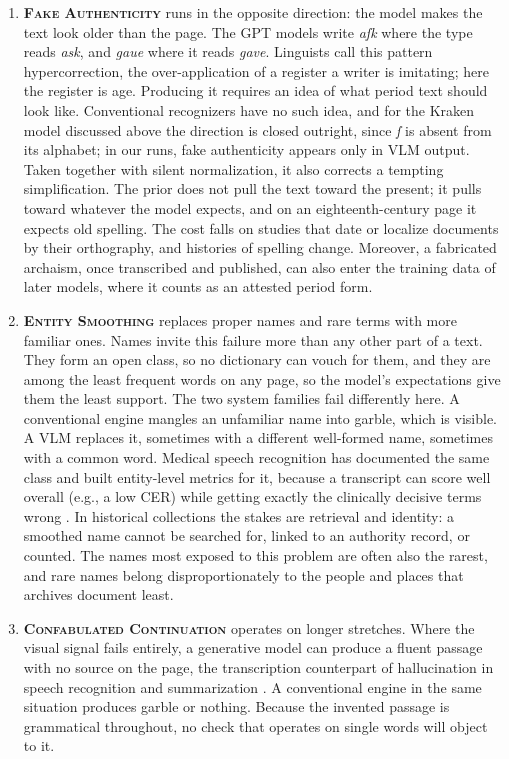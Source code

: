 \documentclass{anthology-ch}         %
\begin{document}
\begin{enumerate}
    \item \textsc{\textbf{Fake Authenticity}} runs in the opposite direction: the model makes the text look older than the page. The GPT models write \emph{aſk} where the type reads \emph{ask}, and \emph{gaue} where it reads \emph{gave}. Linguists call this pattern hypercorrection, the over-application of a register a writer is imitating; here the register is age. Producing it requires an idea of what period text should look like. Conventional recognizers have no such idea, and for the Kraken model discussed above the direction is closed outright, since \emph{ſ} is absent from its alphabet; in our runs, fake authenticity appears only in VLM output. Taken together with silent normalization, it also corrects a tempting simplification. The prior does not pull the text toward the present; it pulls toward whatever the model expects, and on an eighteenth-century page it expects old spelling. The cost falls on studies that date or localize documents by their orthography, and histories of spelling change. Moreover, a fabricated archaism, once transcribed and published, can also enter the training data of later models, where it counts as an attested period form.

    \item \textsc{\textbf{Entity Smoothing}} replaces proper names and rare terms with more familiar ones. Names invite this failure more than any other part of a text. They form an open class, so no dictionary can vouch for them, and they are among the least frequent words on any page, so the model's expectations give them the least support. The two system families fail differently here. A conventional engine mangles an unfamiliar name into garble, which is visible. A VLM replaces it, sometimes with a different well-formed name, sometimes with a common word. Medical speech recognition has documented the same class and built entity-level metrics for it, because a transcript can score well overall (e.g., a low CER) while getting exactly the clinically decisive terms wrong \cite{afonja_performant_2024}. In historical collections the stakes are retrieval and identity: a smoothed name cannot be searched for, linked to an authority record, or counted. The names most exposed to this problem are often also the rarest, and rare names belong disproportionately to the people and places that archives document least.

    \item \textsc{\textbf{Confabulated Continuation}} operates on longer stretches. Where the visual signal fails entirely, a generative model can produce a fluent passage with no source on the page, the transcription counterpart of hallucination in speech recognition and summarization \cite{koudounas_hallucination_2025, maynez_faithfulness_2020}. A conventional engine in the same situation produces garble or nothing. Because the invented passage is grammatical throughout, no check that operates on single words will object to it.


\end{enumerate}
\end{document}
